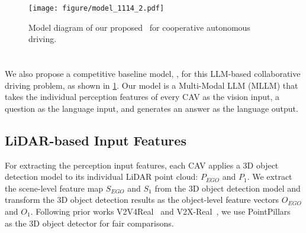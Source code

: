 \begin{figure}[!t]
\centering
\texttt{[image: figure/model\_1114\_2.pdf]}
\caption[]
        {Model diagram of our proposed \namemethod~for cooperative autonomous driving.}         
        \label{fig:model}
        \vspace{-15pt}
\end{figure}


\section{\namemethod}

We also propose a competitive baseline model, \textbf{\namemethod}, for this LLM-based collaborative driving problem, as shown in \cref{fig:model}. Our model is a Multi-Modal LLM (MLLM) that takes the individual perception features of every CAV as the vision input, a question as the language input, and generates an answer as the language output. 

\subsection{LiDAR-based Input Features}
For extracting the perception input features, each CAV applies a 3D object detection model to its individual LiDAR point cloud: $P_{EGO}$ and $P_{1}$. We extract the scene-level feature map $S_{EGO}$ and $S_{1}$ from the 3D object detection model and transform the 3D object detection results as the object-level feature vectors $O_{EGO}$ and $O_{1}$. Following prior works V2V4Real~\cite{xu2023v2v4real} and V2X-Real~\cite{xiang2024v2xreal}, we use PointPillars~\cite{lang2019pointpillar} as the 3D object detector for fair comparisons.

